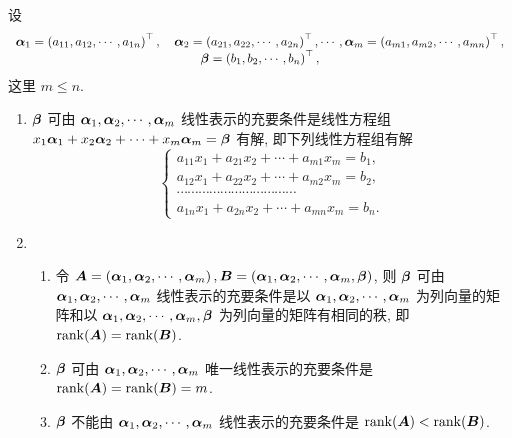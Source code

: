 设
$$\begin{array}{c}
        \vb*{\alpha}_{1}=\left(a_{11}, a_{12}, \cdots, a_{1 n}\right)^{\top}, \quad \vb*{\alpha}_{2}=\left(a_{21}, a_{22}, \cdots, a_{2 n}\right)^{\top}, \cdots, \vb*{\alpha}_{m}=\left(a_{m 1}, a_{m 2}, \cdots, a_{m n}\right)^{\top}, \\
        \vb*{\beta}=\left(b_{1}, b_{2}, \cdots, b_{n}\right)^{\top},
    \end{array}$$
这里 $ m \leqslant n $.
\begin{enumerate}[label=(\arabic{*})]
    \item $\vb*{\beta} $ 可由 $ \vb*{\alpha}_{1}, \vb*{\alpha}_{2}, \cdots, \vb*{\alpha}_{m} $ 线性表示的充要条件是线性方程组 $ x_{1} \vb*{\alpha}_{1}+x_{2} \vb*{\alpha}_{2}+\cdots+   x_{m} \vb*{\alpha}_{m}=\vb*{\beta} $ 有解, 即下列线性方程组有解
          $$\left\{\begin{array}{l}
                  a_{11} x_{1}+a_{21} x_{2}+\cdots+a_{m 1} x_{m}=b_{1},                        \\
                  a_{12} x_{1}+a_{22} x_{2}+\cdots+a_{m 2} x_{m}=b_{2},                        \\
                  \cdots \cdots \cdots \cdots \cdots \cdots \cdots \cdots \cdots \cdots \cdots \\
                  a_{1 n} x_{1}+a_{2 n} x_{2}+\cdots+a_{m n} x_{m}=b_{n} .
              \end{array}\right.$$
    \item \begin{enumerate}
              \item 令 $ \vb*{A}=\left(\vb*{\alpha}_{1}, \vb*{\alpha}_{2}, \cdots, \vb*{\alpha}_{m}\right), \vb*{B}=\left(\vb*{\alpha}_{1}, \vb*{\alpha}_{2}, \cdots, \vb*{\alpha}_{m}, \vb*{\beta}\right) $, 则 $ \vb*{\beta} $ 可由 $ \vb*{\alpha}_{1}, \vb*{\alpha}_{2}, \cdots, \vb*{\alpha}_{m} $ 线性表示的充要条件是以 $ \vb*{\alpha}_{1}, \vb*{\alpha}_{2}, \cdots, \vb*{\alpha}_{m} $ 为列向量的矩阵和以 $ \vb*{\alpha}_{1}, \vb*{\alpha}_{2}, \cdots, \vb*{\alpha}_{m}, \vb*{\beta} $ 为列向量的矩阵有相同的秩, 即 $\rank(\vb*{A})=\rank(\vb*{B}) $.
              \item $ \vb*{\beta} $ 可由 $ \vb*{\alpha}_{1}, \vb*{\alpha}_{2}, \cdots, \vb*{\alpha}_{m} $ 唯一线性表示的充要条件是 $ \rank(\vb*{A})=\rank(\vb*{B})=m $.
              \item $\vb*{\beta} $ 不能由 $ \vb*{\alpha}_{1}, \vb*{\alpha}_{2}, \cdots, \vb*{\alpha}_{m} $ 线性表示的充要条件是 $ \rank(\vb*{A})<\rank(\vb*{B}) $.
          \end{enumerate}

\end{enumerate}
